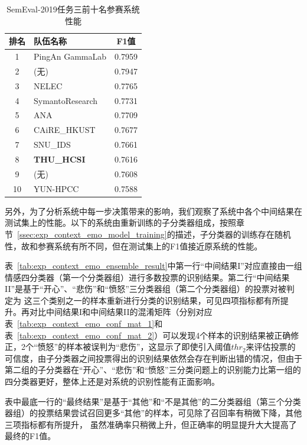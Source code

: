 \begin{table}[htb]
  \centering
  \begin{minipage}[t]{0.6\linewidth}
  \caption{SemEval-2019任务三前十名参赛系统性能} %
  \label{tab:exp_context_emo_other_comp}
    \begin{tabularx}{\linewidth}{c|X|c}
    \toprule[1.5pt]
    排名 & 队伍名称 & F1值 \\
    \hline
    1 & PingAn GammaLab & 0.7959 \\
    2 & (无) & 0.7947 \\
    3 & NELEC & 0.7765 \\
    4 & SymantoResearch & 0.7731 \\
    5 & ANA & 0.7709 \\
    6 & CAiRE\_HKUST & 0.7677 \\
    7 & SNU\_IDS & 0.7661 \\
    8 & \bf THU\_HCSI & 0.7616 \\
    9 & (无) & 0.7608 \\
    10 & YUN-HPCC & 0.7588 \\
    \bottomrule[1.5pt]
    \end{tabularx}
  \end{minipage}
\end{table}

另外，为了分析系统中每一步决策带来的影响，我们观察了系统中各个中间结果在测试集上的性能。以下的系统由重新训练的子分类器组成，按照章节~\ref{ssec:exp_context_emo_model_training}的描述，子分类器的训练存在随机性，故和参赛系统有所不同，但在测试集上的F1值接近原系统的性能。

表~\ref{tab:exp_context_emo_ensemble_result}中第一行“中间结果I”对应直接由一组情感四分类器（第一个分类器组）进行多数投票的识别结果。第二行“中间结果II”是基于“开心”、“悲伤”和“愤怒”三分类器组（第二个分类器组）的投票对被判定为
这三个类别之一的样本重新进行分类的识别结果，可见四项指标都有所提升。再对比中间结果I和中间结果II的混淆矩阵（分别对应表~\ref{tab:exp_context_emo_conf_mat_1}和表~\ref{tab:exp_context_emo_conf_mat_2}）可以发现4个样本的识别结果被正确修正，2个“愤怒”的样本被误判为“悲伤”，这显示了即使引入阈值$thr_2$来评估投票的可信度，由子分类器之间投票得出的识别结果依然会存在判断出错的情况，但由于第二组的子分类器在“开心”、“悲伤”和“愤怒”三分类问题上的识别能力比第一组的四分类器更好，整体上还是对系统的识别性能有正面影响。

表中最底一行的“最终结果”是基于“其他”和“不是其他”的二分类器组（第三个分类器组）的投票结果尝试召回更多“其他”的样本，可见除了召回率有稍微下降，其他三项指标都有所提升，
虽然准确率只稍微上升，但正确率的明显提升大大提高了最终的F1值。

